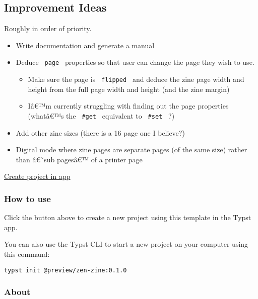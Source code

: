 \subsection{Improvement Ideas}\label{improvement-ideas}

Roughly in order of priority.

\begin{itemize}
\tightlist
\item
  Write documentation and generate a manual
\item
  Deduce \texttt{\ page\ } properties so that user can change the page
  they wish to use.

  \begin{itemize}
  \tightlist
  \item
    Make sure the page is \texttt{\ flipped\ } and deduce the zine page
    width and height from the full page width and height (and the zine
    margin)
  \item
    Iâ€™m currently struggling with finding out the page properties
    (whatâ€™s the \texttt{\ \#get\ } equivalent to \texttt{\ \#set\ } ?)
  \end{itemize}
\item
  Add other zine sizes (there is a 16 page one I believe?)
\item
  Digital mode where zine pages are separate pages (of the same size)
  rather than â€˜sub pagesâ€™ of a printer page
\end{itemize}

\href{/app?template=zen-zine&version=0.1.0}{Create project in app}

\subsubsection{How to use}\label{how-to-use}

Click the button above to create a new project using this template in
the Typst app.

You can also use the Typst CLI to start a new project on your computer
using this command:

\begin{verbatim}
typst init @preview/zen-zine:0.1.0
\end{verbatim}



\subsubsection{About}\label{about}

